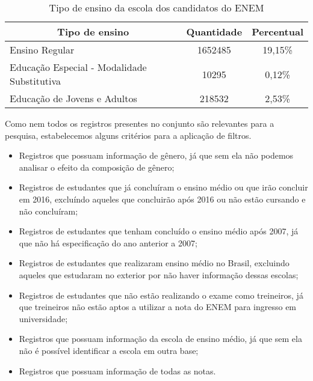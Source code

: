     \begin{table}[h]
      \begin{tabular}{lcc}
      \hline
      \multicolumn{1}{c}{\textbf{Tipo de ensino}} & \multicolumn{1}{c}{\textbf{Quantidade}} & \multicolumn{1}{c}{\textbf{Percentual}} \\ \hline
      Ensino Regular                              & 1652485                                 & 19,15\%                                 \\ \hline
      Educação Especial - Modalidade Substitutiva & 10295                                   & 0,12\%                                  \\ \hline
      Educação de Jovens e Adultos                & 218532                                  & 2,53\%                                  \\ \hline
      \end{tabular}
      \caption{Tipo de ensino da escola dos candidatos do ENEM}
      \label{tab:tipo-ensino}
      \end{table}

Como nem todos os registros presentes no conjunto são relevantes para a pesquisa, estabelecemos alguns critérios para a aplicação de filtros.
\begin{itemize}
  \item Registros que possuam informação de gênero, já que sem ela não podemos analisar o efeito da composição de gênero;
  \item Registros de estudantes que já concluíram o ensino médio ou que irão concluir em 2016, excluíndo aqueles que concluirão após 2016 ou não estão cursando e não concluíram; 
  \item Registros de estudantes que tenham concluído o ensino médio após 2007, já que não há especificação do ano anterior a 2007;
  \item Registros de estudantes que realizaram ensino médio no Brasil, excluindo aqueles que estudaram no exterior por não haver informação dessas escolas;
  \item Registros de estudantes que não estão realizando o exame como treineiros, já que treineiros não estão aptos a utilizar a nota do ENEM para ingresso em universidade;
  \item Registros que possuam informação da escola de ensino médio, já que sem ela não é possível identificar a escola em outra base;
  \item Registros que possuam informação de todas as notas.
\end{itemize}

